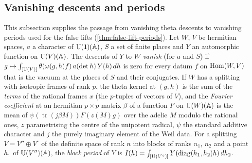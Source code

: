 \subsection{Vanishing descents and periods}\label{ss:B-periods}
This subsection supplies the passage from vanishing theta descents to vanishing periods used for the false lifts (\cref{thm:false-lift-periods}). Let $W$, $V$ be hermitian spaces, $a$ a character of $\operatorname{U}(1)(\mathbb{A})$,
$S$ a set of finite places and $Y$ an automorphic function on $\operatorname{U}(V)(\mathbb{A})$. The descents of $Y$ to $W$ \emph{vanish} (for $a$ and $S$) if $g\mapsto\int_{[\operatorname{U}(V)]}\theta(\omega(g,h)f)\,a(\det h)\,Y(h)\,dh$ is zero for every datum
$f$ on $\operatorname{Hom}(W,V)$ that is the vacuum at the places of $S$ and their conjugates. If $W$ has a splitting with isotropic frames of rank $p$, the theta kernel at $(g,h)$ is the sum of the \emph{terms} of the rational frames
$x$ (the $p$-tuples of vectors of $V$), and the \emph{Fourier coefficient} at an hermitian $p\times p$ matrix $\beta$ of a function $F$ on $\operatorname{U}(W)(\mathbb{A})$ is the mean of $\psi(\operatorname{tr}(j\beta M))F(z(M)g)$ over the adelic $M$
modulo the rational ones, $z$ parametrising the centre of the unipotent radical, $\psi$ the standard additive character and $j$ the purely imaginary element of the Weil data. For a splitting $V=V''\oplus V^\circ$ of
the definite space of rank $n$ into blocks of ranks $n_1$, $n_2$ and a point $h_1$ of $\operatorname{U}(V'')(\mathbb{A})$, the \emph{block period} of $Y$ is $I(h)=\int_{[\operatorname{U}(V^\circ)]}Y(\mathrm{diag}(h_1,h_2)h)\,dh_2$.


